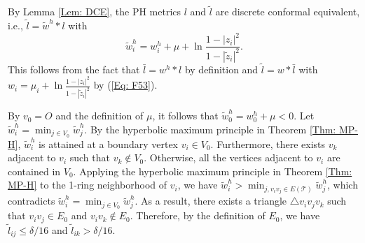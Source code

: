 \documentclass[12pt]{amsart}
\theoremstyle{definition}
\begin{document}
By Lemma \ref{Lem: DCE}, the PH metrics $l$ and $\tilde l$ are discrete conformal equivalent, i.e., $\tilde l =\tilde w^h*l$ with
\begin{equation*}
\tilde w^h_i
=w^h_i+\mu+\ln\frac{1-|z_i|^2}{1-|\tilde z_i|^2}.
\end{equation*}
This follows from the fact that $\bar l=w^h*l$ by definition and $\tilde{l}=w* \bar l$ with $w_i=\mu_i+\ln\frac{1-|z_i|^2}{1-|\tilde z_i|^2}$ by (\ref{Eq: F53}).

By $v_0=O$ and the definition of $\mu$, it follows that $\tilde w^h_0=w^h_0+\mu<0$.
Let $\tilde w^h_i=\min_{j\in V_0} \tilde w^h_j$.
By the hyperbolic maximum principle in Theorem \ref{Thm: MP-H}, $\tilde w^h_i$ is attained at a boundary vertex $v_i\in V_0$.
Furthermore, there exists $v_k$ adjacent to $v_i$ such that $v_k\notin V_0$.
Otherwise, all the vertices adjacent to $v_i$ are contained in $V_0$.
Applying the hyperbolic maximum principle in Theorem \ref{Thm: MP-H}
to the 1-ring neighborhood of $v_i$, we have $\tilde w^h_i>\min_{j, v_iv_j\in E(\mathcal{T})} \tilde w^h_j$, which contradicts $\tilde w^h_i=\min_{j\in V_0} \tilde w^h_j$.
As a result, there exists a triangle $\triangle v_iv_jv_k$ such that $v_iv_j\in E_0$ and $v_iv_k\not\in E_0$.
Therefore, by the definition of $E_0$, we have $\tilde l_{ij}\leq \delta/16$ and $\tilde l_{ik}>\delta/16$.
\end{document}
